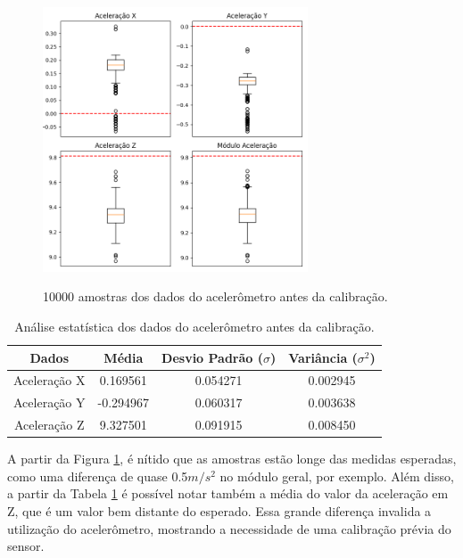 \documentclass[acronym, symbols, table]{fei}
\begin{document}
	\begin{figure}[!htb]
		\centering
		\caption{10000 amostras dos dados do acelerômetro antes da calibração.}
		\includegraphics[width=0.7\textwidth]{dados_acelerometro_errados.png}
		\label{fig:dados_acelerometro_errado}
	\end{figure}
	
	\begin{table}[!htb]
		\centering
		\caption{Análise estatística dos dados do acelerômetro antes da calibração.}\label{tab:acelerometro_antes_calibracao}
		\begin{tabular}{|c|c|c|c|}
			\hline
			Dados & Média & Desvio Padrão ($\sigma$) & Variância ($\sigma^2$) \\ \hline
			\small Aceleração X & 0.169561  & 0.054271 & 0.002945 \\ \hline
			\small Aceleração Y & -0.294967 & 0.060317 & 0.003638 \\ \hline
			\small Aceleração Z & 9.327501  & 0.091915 & 0.008450 \\ \hline			
		\end{tabular}
	\end{table}
	
	A partir da Figura \ref{fig:dados_acelerometro_errado}, é nítido que as amostras estão longe das medidas esperadas, como uma diferença de quase 0.5$m/s^2$ no módulo geral, por exemplo. Além disso, a partir da Tabela \ref{tab:acelerometro_antes_calibracao} é possível notar também a média do valor da aceleração em Z, que é um valor bem distante do esperado. Essa grande diferença invalida a utilização do acelerômetro, mostrando a necessidade de uma calibração prévia do sensor.
	
\end{document}
